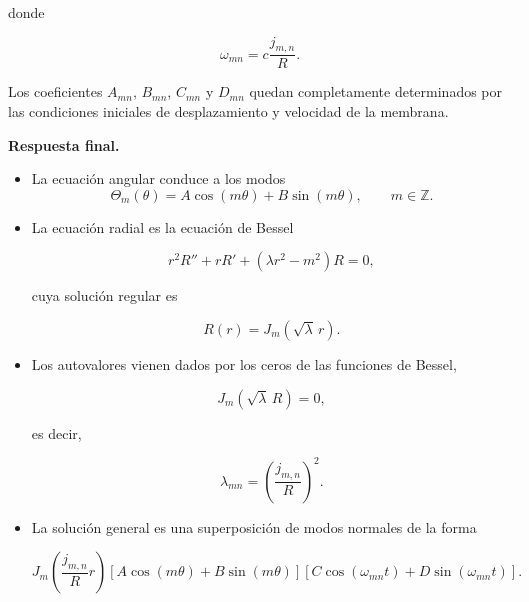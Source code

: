 \documentclass[12pt]{article}
\begin{document}
donde

\begin{equation}
\boxed{
\omega_{mn}
=
c
\frac{j_{m,n}}{R}.
}
\end{equation}

Los coeficientes $A_{mn}$, $B_{mn}$, $C_{mn}$ y $D_{mn}$ quedan completamente determinados por las condiciones iniciales de desplazamiento y velocidad de la membrana.

\bigskip

\noindent
\textbf{Respuesta final.}

\begin{itemize}
\item La ecuación angular conduce a los modos
\[
\Theta_m(\theta)=A\cos(m\theta)+B\sin(m\theta),
\qquad
m\in\mathbb Z.
\]

\item La ecuación radial es la ecuación de Bessel

\[
r^2R''
+rR'
+
(\lambda r^2-m^2)R=0,
\]

cuya solución regular es

\[
R(r)=J_m(\sqrt{\lambda}\,r).
\]

\item Los autovalores vienen dados por los ceros de las funciones de Bessel,

\[
J_m(\sqrt{\lambda}\,R)=0,
\]

es decir,

\[
\lambda_{mn}
=
\left(
\frac{j_{m,n}}{R}
\right)^2.
\]

\item La solución general es una superposición de modos normales de la forma

\[
J_m\!\left(\frac{j_{m,n}}{R}r\right)
\left[
A\cos(m\theta)+B\sin(m\theta)
\right]
\left[
C\cos(\omega_{mn}t)+D\sin(\omega_{mn}t)
\right].
\]
\end{itemize}
\end{document}
